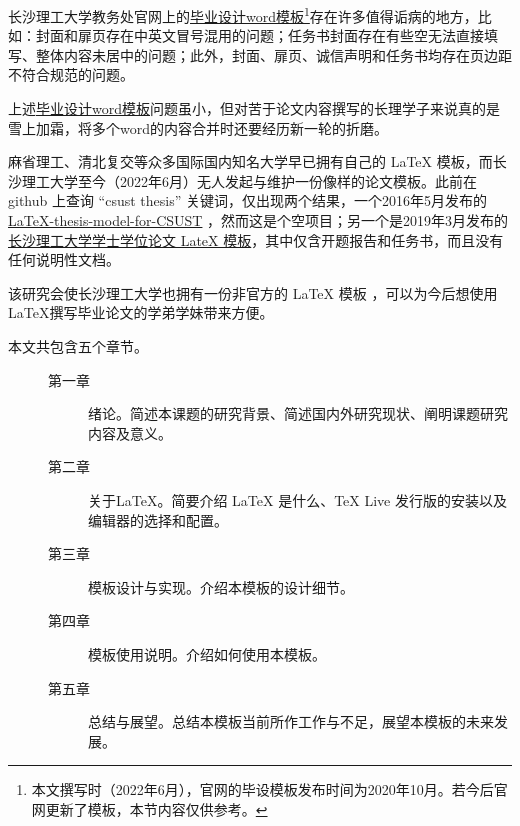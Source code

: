 
长沙理工大学教务处官网上的\href{https://www.csust.edu.cn/jwc/sjjx/bysj.htm}{毕业设计word模板}\footnote{本文撰写时（2022年6月），官网的毕设模板发布时间为2020年10月。若今后官网更新了模板，本节内容仅供参考。}存在许多值得诟病的地方，比如：封面和扉页存在中英文冒号混用的问题；任务书封面存在有些空无法直接填写、整体内容未居中的问题；此外，封面、扉页、诚信声明和任务书均存在页边距不符合规范的问题。

上述\href{https://www.csust.edu.cn/jwc/sjjx/bysj.htm}{毕业设计word模板}问题虽小，但对苦于论文内容撰写的长理学子来说真的是雪上加霜，将多个word的内容合并时还要经历新一轮的折磨。


麻省理工、清北复交等众多国际国内知名大学早已拥有自己的 \LaTeX{} 模板，而长沙理工大学至今（2022年6月）无人发起与维护一份像样的论文模板。此前在 github 上查询 “csust thesis” 关键词，仅出现两个结果，一个2016年5月发布的 \href{https://github.com/zonkisa/LaTeX-thesis-model-for-CSUST}{LaTeX-thesis-model-for-CSUST} ，然而这是个空项目；另一个是2019年3月发布的\href{https://github.com/leoppro/csust_thesis_latex}{长沙理工大学学士学位论文 LateX 模板}，其中仅含开题报告和任务书，而且没有任何说明性文档。

该研究会使长沙理工大学也拥有一份非官方的 \LaTeX{} 模板 ，可以为今后想使用 \LaTeX 撰写毕业论文的学弟学妹带来方便。

本文共包含五个章节。

\vspace{-1.5\baselineskip}
\begin{description}
    \item[\hspace{2em}]\!\!
\begin{description}
    \item[第一章] 绪论。简述本课题的研究背景、简述国内外研究现状、阐明课题研究内容及意义。
    \item[第二章] 关于\LaTeX{}。简要介绍 \LaTeX{} 是什么、\TeX{} Live 发行版的安装以及编辑器的选择和配置。
    \item[第三章] 模板设计与实现。介绍本模板的设计细节。
    \item[第四章] 模板使用说明。介绍如何使用本模板。
    \item[第五章] 总结与展望。总结本模板当前所作工作与不足，展望本模板的未来发展。
\end{description} 
\end{description}